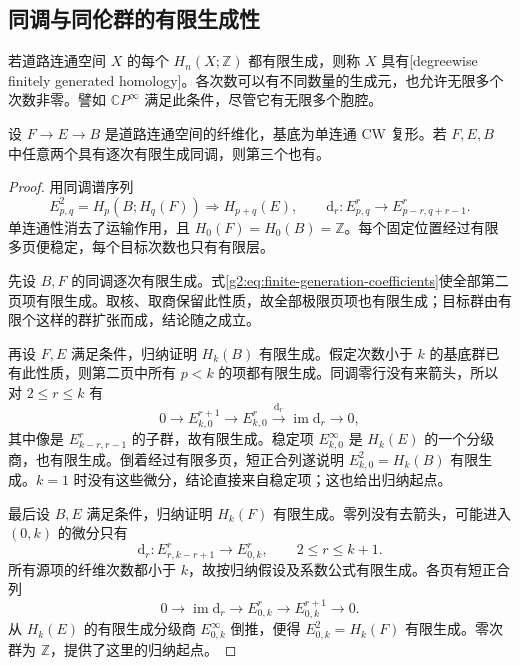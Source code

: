 \subsection{同调与同伦群的有限生成性}
\label{g2:subsec:1105:02}

若道路连通空间 \(X\) 的每个 \(H_n(X;\mathbb Z)\) 都有限生成，则称 \(X\) 具有[degreewise finitely generated homology]。各次数可以有不同数量的生成元，也允许无限多个次数非零。譬如 \(\mathbb CP^\infty\) 满足此条件，尽管它有无限多个胞腔。

\begin{lemma}\label{g2:lem:fibration-finite-generation}
	设 \(F\to E\to B\) 是道路连通空间的纤维化，基底为单连通 CW 复形。若 \(F,E,B\) 中任意两个具有逐次有限生成同调，则第三个也有。
\end{lemma}
\begin{proof}
	用同调谱序列
	\[
		E^2_{p,q}=H_p(B;H_q(F))\Longrightarrow H_{p+q}(E),\qquad
		\mathrm d_r:E^r_{p,q}\to E^r_{p-r,q+r-1}.
	\]
	单连通性消去了运输作用，且 \(H_0(F)=H_0(B)=\mathbb Z\)。每个固定位置经过有限多页便稳定，每个目标次数也只有有限层。

	先设 \(B,F\) 的同调逐次有限生成。式\eqref{g2:eq:finite-generation-coefficients}使全部第二页项有限生成。取核、取商保留此性质，故全部极限页项也有限生成；目标群由有限个这样的群扩张而成，结论随之成立。

	再设 \(F,E\) 满足条件，归纳证明 \(H_k(B)\) 有限生成。假定次数小于 \(k\) 的基底群已有此性质，则第二页中所有 \(p<k\) 的项都有限生成。同调零行没有来箭头，所以对 \(2\le r\le k\) 有
	\[
		0\longrightarrow E^{r+1}_{k,0}\longrightarrow E^r_{k,0}
		\xrightarrow{\mathrm d_r}\operatorname{im}\mathrm d_r\longrightarrow0,
	\]
	其中像是 \(E^r_{k-r,r-1}\) 的子群，故有限生成。稳定项 \(E^\infty_{k,0}\) 是 \(H_k(E)\) 的一个分级商，也有限生成。倒着经过有限多页，短正合列遂说明 \(E^2_{k,0}=H_k(B)\) 有限生成。\(k=1\) 时没有这些微分，结论直接来自稳定项；这也给出归纳起点。

	最后设 \(B,E\) 满足条件，归纳证明 \(H_k(F)\) 有限生成。零列没有去箭头，可能进入 \((0,k)\) 的微分只有
	\[
		\mathrm d_r:E^r_{r,k-r+1}\longrightarrow E^r_{0,k},\qquad 2\le r\le k+1.
	\]
	所有源项的纤维次数都小于 \(k\)，故按归纳假设及系数公式有限生成。各页有短正合列
	\[
		0\longrightarrow\operatorname{im}\mathrm d_r\longrightarrow E^r_{0,k}
		\longrightarrow E^{r+1}_{0,k}\longrightarrow0.
	\]
	从 \(H_k(E)\) 的有限生成分级商 \(E^\infty_{0,k}\) 倒推，便得 \(E^2_{0,k}=H_k(F)\) 有限生成。零次群为 \(\mathbb Z\)，提供了这里的归纳起点。
\end{proof}

